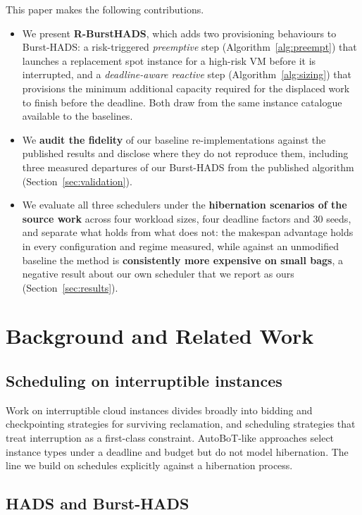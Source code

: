\documentclass[conference]{IEEEtran}
\begin{document}
This paper makes the following contributions.

\begin{itemize}
\item We present \textbf{R-BurstHADS}, which adds two provisioning behaviours to
Burst-HADS: a risk-triggered \emph{preemptive} step (Algorithm~\ref{alg:preempt})
that launches a replacement spot instance for a high-risk VM before it is
interrupted, and a \emph{deadline-aware reactive} step
(Algorithm~\ref{alg:sizing}) that provisions the minimum additional capacity
required for the displaced work to finish before the deadline. Both draw from
the same instance catalogue available to the baselines.
\item We \textbf{audit the fidelity} of our baseline re-implementations against
the published results and disclose where they do not reproduce them, including
three measured departures of our Burst-HADS from the published algorithm
(Section~\ref{sec:validation}).
\item We evaluate all three schedulers under the \textbf{hibernation scenarios of
the source work} across four workload sizes, four deadline factors and 30
seeds, and separate what holds from what does not: the makespan advantage
holds in every configuration and regime measured, while against an unmodified
baseline the method is \textbf{consistently more expensive on small bags},
a negative result about our own scheduler that we report as ours
(Section~\ref{sec:results}).
\end{itemize}

\section{Background and Related Work}

\subsection{Scheduling on interruptible instances}

Work on interruptible cloud instances divides broadly into bidding and
checkpointing strategies for surviving reclamation, and scheduling strategies
that treat interruption as a first-class constraint. AutoBoT-like approaches
select instance types under a deadline and budget but do not model hibernation.
The line we build on schedules explicitly against a hibernation process.

\subsection{HADS and Burst-HADS}
\end{document}
